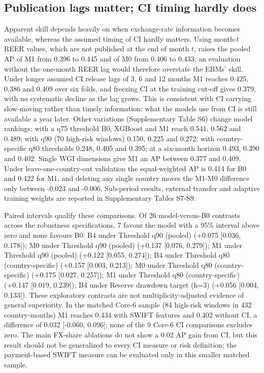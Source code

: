 \documentclass[preprint,12pt,authoryear]{elsarticle}
\begin{document}
\subsection{Publication lags matter; CI timing hardly does}
Apparent skill depends heavily on when exchange-rate information becomes available, whereas the assumed timing of CI hardly matters. Using month-$t$ REER values, which are not published at the end of month $t$, raises the pooled AP of M1 from 0.396 to 0.445 and of M0 from 0.406 to 0.433; an evaluation without the one-month REER lag would therefore overstate the EBMs' skill. Under longer assumed CI release lags of 3, 6 and 12 months M1 reaches 0.425, 0.386 and 0.409 over six folds, and freezing CI at the training cut-off gives 0.379, with no systematic decline as the lag grows. This is consistent with CI carrying slow-moving rather than timely information: what the models use from CI is still available a year later. Other variations (Supplementary Table S6) change model rankings: with a q75 threshold B0, XGBoost and M1 reach 0.541, 0.562 and 0.489; with q90 (70 high-risk windows) 0.150, 0.225 and 0.272; with country-specific q80 thresholds 0.248, 0.405 and 0.395; at a six-month horizon 0.493, 0.390 and 0.402. Single WGI dimensions give M1 an AP between 0.377 and 0.409. Under leave-one-country-out validation the equal-weighted AP is 0.414 for B0 and 0.422 for M1, and deleting any single country moves the M1-M0 difference only between -0.023 and -0.006. Sub-period results, external transfer and adaptive training weights are reported in Supplementary Tables S7-S9.

Paired intervals qualify these comparisons. Of 26 model-versus-B0 contrasts across the robustness specifications, 7 favour the model with a 95\% interval above zero and none favours B0: B4 under Threshold q90 (pooled) (+0.075 [0.036, 0.178]); M0 under Threshold q90 (pooled) (+0.137 [0.076, 0.279]); M1 under Threshold q90 (pooled) (+0.122 [0.055, 0.274]); B4 under Threshold q80 (country-specific) (+0.157 [0.003, 0.213]); M0 under Threshold q80 (country-specific) (+0.175 [0.027, 0.257]); M1 under Threshold q80 (country-specific) (+0.147 [0.019, 0.239]); B4 under Reserve drawdown target (h=3) (+0.056 [0.004, 0.133]). These exploratory contrasts are not multiplicity-adjusted evidence of general superiority. In the matched Core-6 sample (84 high-risk windows in 432 country-months) M1 reaches 0.434 with SWIFT features and 0.402 without CI, a difference of 0.032 [-0.060, 0.096]; none of the 9 Core-6 CI comparisons excludes zero. The main FX-share ablations do not show a 0.02 AP gain from CI, but this result should not be generalized to every CI measure or risk definition; the payment-based SWIFT measure can be evaluated only in this smaller matched sample.
\end{document}
